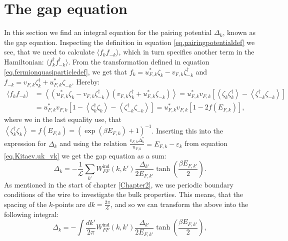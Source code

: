 \section{The gap equation} \label{sec.pairingpotential.integralequation}
In this section we find an integral equation for the pairing potential $\Delta_k$, known as the gap equation. Inspecting the definition in equation \eqref{eq.pairingpotentialdef} we see, that we need to calculate $\langle f_k f_{-k} \rangle$, which in turn specifies another term in the Hamiltonian: $\langle f^\dagger_k f^\dagger_{-k} \rangle$. From the transformation defined in equation \eqref{eq.fermionquasiparticledef}, we get that $f_k = u^*_{F,k}\zeta_k - v_{F,k}\zeta^\dagger_{-k}$ and $f_{-k} = v_{F,k}\zeta^\dagger_k + u^*_{F,k}\zeta_{-k}$. Hereby:
\begin{align}
\langle f_k f_{-k} \rangle &= \left \langle (u^*_{F,k}\zeta_k - v_{F,k}\zeta^\dagger_{-k}) (v_{F,k}\zeta^\dagger_k + u^*_{F,k}\zeta_{-k}) \right \rangle = u^*_{F,k}v_{F,k}\left[ \left \langle \zeta_k \zeta^\dagger_{k} \right \rangle - \left \langle \zeta^\dagger_{-k} \zeta_{-k} \right \rangle \right]  \nonumber \\
& =  u^*_{F,k}v_{F,k}\left[ 1 - \left \langle \zeta^\dagger_{k} \zeta_k \right \rangle - \left \langle \zeta^\dagger_{-k} \zeta_{-k} \right \rangle \right] = u^*_{F,k}v_{F,k}\left[1 - 2f(E_{F,k})\right], \nonumber
\end{align}
where we in the last equality use, that $\left \langle \zeta^\dagger_{k} \zeta_{k} \right \rangle = f(E_{F,k})=(\exp(\beta E_{F,k})+1)^{-1} $. Inserting this into the expression for $\Delta_k$ and using the relation $\frac{v_{F,k}\Delta^*_k}{u_{F,k}}=E_{F,k}-\varepsilon_k$ from equation \eqref{eq.Kitaev.uk_vk} we get the gap equation as a sum:
\begin{equation}
\Delta_k = - \frac{1}{\mathcal{L}}\sum_{k'} W^\text{ind}_{FF}(k,k')\frac{\Delta_{k'}}{2E_{F,k'}}\tanh\left(\frac{\beta E_{F,k'}}{2}\right).
\label{eq.GapequationSum}
\end{equation} 
As mentioned in the start of chapter \ref{Chapter2}, we use periodic boundary conditions of the wire to investigate the bulk properties. This means, that the spacing of the $k$-points are $dk = \frac{2\pi}{\mathcal{L}}$, and so we can transform the above into the following integral:
\begin{equation}
\Delta_k = - \int \frac{dk'}{2\pi} W^\text{ind}_{FF}(k,k')\frac{\Delta_{k'}}{2E_{F,k'}}\tanh\left(\frac{\beta E_{F,k'}}{2}\right), 
\label{eq.GapequationIntegral}
\end{equation} 
